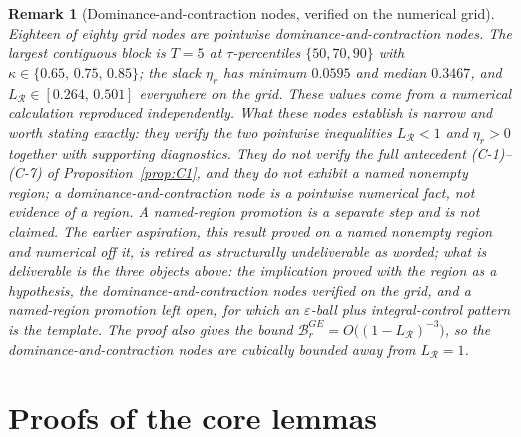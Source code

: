 \documentclass[11pt]{article}
\newtheorem{remark}{Remark}
\begin{document}
\begin{remark}[Dominance-and-contraction nodes, verified on the numerical grid]
\label{rem:C1record}
Eighteen of eighty grid nodes are pointwise \emph{dominance-and-contraction nodes}. The largest
contiguous block is $T = 5$ at $\tau$-percentiles $\{50,70,90\}$ with
$\kappa \in \{0.65,\,0.75,\,0.85\}$; the slack $\eta_r$ has minimum $0.0595$ and median $0.3467$, and
$L_{\mathcal R} \in [0.264,\,0.501]$ everywhere on the grid. These values come from a numerical
calculation reproduced independently. What these nodes establish is narrow and
worth stating exactly: they verify the two pointwise inequalities $L_{\mathcal R} < 1$ and
$\eta_r > 0$ together with supporting diagnostics. They do \emph{not} verify the full antecedent
(C-1)--(C-7) of Proposition~\ref{prop:C1}, and they do \emph{not} exhibit a named nonempty region; a
dominance-and-contraction node is a pointwise numerical fact, not evidence of a region. A
named-region promotion is a separate step and is not claimed. The earlier aspiration, this result
proved on a named nonempty region and numerical off it, is retired as structurally undeliverable
as worded; what is deliverable is the three objects above: the implication proved with the region as
a hypothesis, the dominance-and-contraction nodes verified on the grid, and a named-region promotion
left open, for which an $\varepsilon$-ball plus integral-control pattern is the template. The
proof also gives the bound $\mathcal B_r^{GE} = O\bigl((1-L_{\mathcal R})^{-3}\bigr)$, so
the dominance-and-contraction nodes are cubically bounded away from $L_{\mathcal R} = 1$.
\end{remark}

\section{Proofs of the core lemmas}
\label{sec:proofs-core}\label{sec:proofs}
\end{document}

